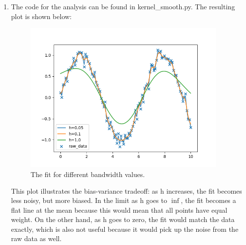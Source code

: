 \documentclass[10pt]{article}
\begin{document}
\begin{enumerate}[label=(\Alph*)]
    \item
    The code for the analysis can be found in kernel\_smooth.py. The resulting plot is shown below: 
    \begin{figure}[htb] \centering
    \includegraphics[width=0.95\textwidth]{./gaussian_kernel.png}
    \caption{The fit for different bandwidth values.}
    \label{fig:gaussian_kernel}
    \end{figure}
    
    This plot illustrates the bias-variance tradeoff: as h increases, the fit becomes less noisy, but more biased. In the limit as h goes to $\inf$, the fit becomes a flat line at the mean because this would mean that all points have equal weight. On the other hand, as h goes to zero, the fit would match the data exactly, which is also not useful because it would pick up the noise from the raw data as well.
	\end{enumerate}
\end{document}
